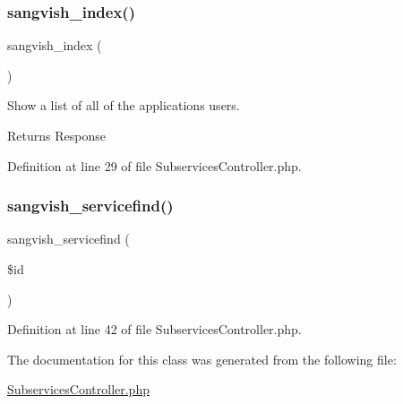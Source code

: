 \subsubsection{\texorpdfstring{sangvish\_index()}{sangvish\_index()}}
{\footnotesize\ttfamily sangvish\+\_\+index (\begin{DoxyParamCaption}{ }\end{DoxyParamCaption})}

Show a list of all of the application\textquotesingle{}s users.

\begin{DoxyReturn}{Returns}
Response 
\end{DoxyReturn}


Definition at line 29 of file Subservices\+Controller.\+php.

\mbox{\label{class_responsive_1_1_http_1_1_controllers_1_1_subservices_controller_aea162ead4cf81b3961ac8ccf4b1a5686}} 
\subsubsection{\texorpdfstring{sangvish\_servicefind()}{sangvish\_servicefind()}}
{\footnotesize\ttfamily sangvish\+\_\+servicefind (\begin{DoxyParamCaption}\item[{}]{\$id }\end{DoxyParamCaption})}



Definition at line 42 of file Subservices\+Controller.\+php.



The documentation for this class was generated from the following file\+:\begin{DoxyCompactItemize}
\item 
\mbox{\hyperlink{_subservices_controller_8php}{Subservices\+Controller.\+php}}\end{DoxyCompactItemize}
